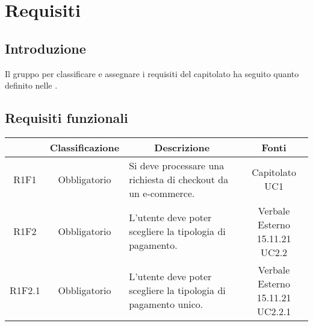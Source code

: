 \section{Requisiti} \label{section:requisiti}

\subsection{Introduzione}
Il gruppo \groupName{} per classificare e assegnare i requisiti del capitolato ha seguito quanto definito nelle \docNameVersionNdP{}.

\subsection{Requisiti funzionali} \label{subsection:requisiti_funzionali}
\begin{table}[H]
    \centering
    \renewcommand{\arraystretch}{1.8}
    \begin{tabular}{c | c | p{6cm} | c }
        \rowcolor[HTML]{125E28}
        \multicolumn{1}{c}{\color[HTML]{FFFFFF} \textbf{Codice}}          &
        \multicolumn{1}{c}{\color[HTML]{FFFFFF} \textbf{Classificazione}} &
        \multicolumn{1}{c}{\color[HTML]{FFFFFF} \textbf{Descrizione}}     &
        \multicolumn{1}{c}{\color[HTML]{FFFFFF} \textbf{Fonti}}                                                                                                                                                                      \\
        \hline
        R1F1                                                              & Obbligatorio & Si deve processare una richiesta di checkout da un e-commerce\glo{}.                          & \Shortunderstack{Capitolato               \\UC1\\}                        \\
        R1F2                                                              & Obbligatorio & L'utente deve poter scegliere la tipologia di pagamento.                                      & \Shortunderstack{Verbale Esterno 15.11.21 \\UC2.2\\}        \\
        R1F2.1                                                            & Obbligatorio & L'utente deve poter scegliere la tipologia di pagamento unico.                                & \Shortunderstack{Verbale Esterno 15.11.21 \\UC2.2.1\\}      \\

\end{tabular}
\end{table}
